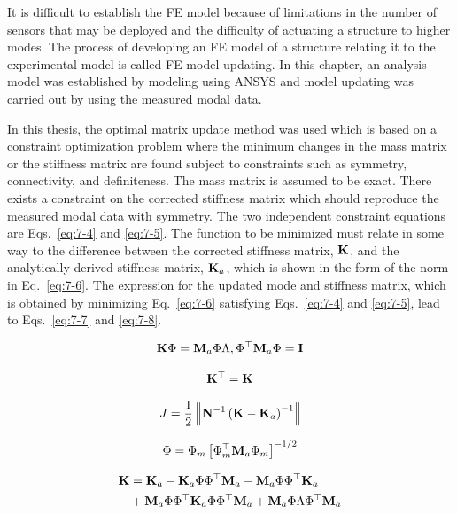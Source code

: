 It is difficult to establish the FE model because of limitations in the number of sensors that may be deployed and the difficulty of actuating a structure to higher modes. The process of developing an FE model of a structure relating it to the experimental model is called FE model updating\citep{bagchi2005updating}. In this chapter, an analysis model was established by modeling using ANSYS and model updating was carried out by using the measured modal data.

In this thesis, the optimal matrix update method was used which is based on a constraint optimization problem where the minimum changes in the mass matrix or the stiffness matrix are found subject to constraints such as symmetry, connectivity, and definiteness\citep{baruch1978optimization, baruch1979optimal}. The mass matrix is assumed to be exact. There exists a constraint on the corrected stiffness matrix which should reproduce the measured modal data with symmetry. The two independent constraint equations are Eqs.~\eqref{eq:7-4} and \eqref{eq:7-5}. The function to be minimized must relate in some way to the difference between the corrected stiffness matrix, $\mathbf{K}$, and the analytically derived stiffness matrix, $\mathbf{K}_{a}$, which is shown in the form of the norm in Eq.~\eqref{eq:7-6}. The expression for the updated mode and stiffness matrix, which is obtained by minimizing Eq.~\eqref{eq:7-6} satisfying Eqs.~\eqref{eq:7-4} and \eqref{eq:7-5}, lead to Eqs.~\eqref{eq:7-7} and \eqref{eq:7-8}\citep{baruch1979optimal, baruch1978optimization}.

\begin{equation}\label{eq:7-4}
\mathbf{K}\Phi = \mathbf{M}_{a}\Phi\Lambda, \Phi^{\top}\mathbf{M}_{a}\Phi = \mathbf{I}
\end{equation}

\begin{equation}\label{eq:7-5}
\mathbf{K}^{\top} = \mathbf{K}
\end{equation}

\begin{equation}\label{eq:7-6}
J=\frac{1}{2}\left\| \mathbf{N}^{-1}\left(\mathbf{K}-\mathbf{K}_{a}\right)^{-1}\right\|
\end{equation}

\begin{equation}\label{eq:7-7}
\Phi = \Phi_{m} \left[ \Phi_{m}^{\top}\mathbf{M}_{a}\Phi_{m}\right]^{-1/2}
\end{equation}

\begin{equation}\label{eq:7-8}
\begin{aligned}
\mathbf{K}&=\mathbf{K}_{a} - \mathbf{K}_{a}\Phi\Phi^{\top}\mathbf{M}_{a}-\mathbf{M}_{a}\Phi\Phi^{\top}\mathbf{K}_{a}\\
&+\mathbf{M}_{a}\Phi\Phi^{\top}\mathbf{K}_{a}\Phi\Phi^{\top}\mathbf{M}_{a} + \mathbf{M}_{a}\Phi\Lambda\Phi^{\top}\mathbf{M}_{a}
\end{aligned}
\end{equation}

